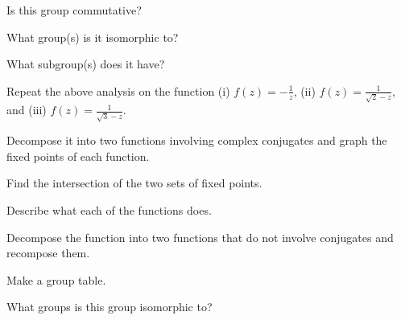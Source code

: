 \documentclass[../gatm_answers.tex]{subfiles}
\begin{document}
\begin{inner_problem}
\item Is this group commutative?
\end{inner_problem}

\begin{inner_problem}
\item What group(s) is it isomorphic to?
\end{inner_problem}

\begin{inner_problem}
\item What subgroup(s) does it have?
\end{inner_problem}

\begin{outer_problem}
\item Repeat the above analysis on the function (i) $f(z)=-\frac{1}{z}$, (ii) $f(z)=\frac{1}{\sqrt{2}-z}$, and (iii) $f(z)=\frac{1}{\sqrt{3}-z}$.
\end{outer_problem}

\begin{inner_problem}[start=1]
\item Decompose it into two functions involving complex conjugates and graph the fixed points of each function.
\end{inner_problem}

\begin{inner_problem}
\item Find the intersection of the two sets of fixed points.
\end{inner_problem}

\begin{inner_problem}
\item Describe what each of the functions does.
\end{inner_problem}

\begin{inner_problem}
\item Decompose the function into two functions that do not involve conjugates and recompose them.
\end{inner_problem}

\begin{inner_problem}
\item Make a group table.
\end{inner_problem}

\begin{inner_problem}
\item What groups is this group isomorphic to?
\end{inner_problem}
\end{document}
